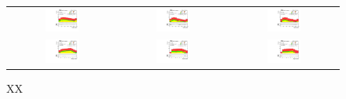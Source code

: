  \begin{figure}[tbh!]
 \begin{center}
 \begin{tabular}{ccc}
 \includegraphics[width=0.33\textwidth]{figures/Part4/Evt/LFVemuM}&
 \includegraphics[width=0.33\textwidth]{figures/Part4/Evt/LFVetaM}&
 \includegraphics[width=0.33\textwidth]{figures/Part4/Evt/LFVmutaM}\\
 \includegraphics[width=0.33\textwidth]{figures/Part4/Evt/LFVemuDr}&
 \includegraphics[width=0.33\textwidth]{figures/Part4/Evt/LFVetaDr}&
 \includegraphics[width=0.33\textwidth]{figures/Part4/Evt/LFVmutaDr}\\
 \end{tabular}
 \caption{XX}
 \label{fig:LFVmass}
 \end{center}
 \end{figure}

